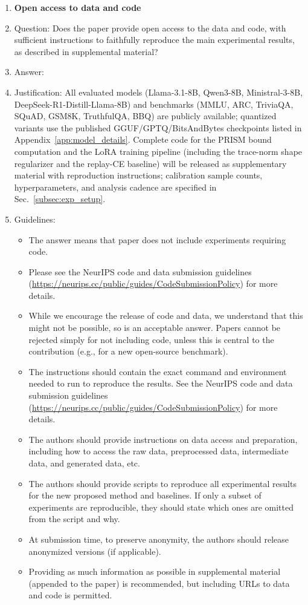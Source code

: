 \begin{enumerate}
\item {\bf Open access to data and code}
    \item[] Question: Does the paper provide open access to the data and code, with sufficient instructions to faithfully reproduce the main experimental results, as described in supplemental material?
    \item[] Answer: \answerYes{}
    \item[] Justification: All evaluated models (Llama-3.1-8B, Qwen3-8B, Ministral-3-8B, DeepSeek-R1-Distill-Llama-8B) and benchmarks (MMLU, ARC, TriviaQA, SQuAD, GSM8K, TruthfulQA, BBQ) are publicly available; quantized variants use the published GGUF/GPTQ/BitsAndBytes checkpoints listed in Appendix~\ref{app:model_details}. Complete code for the PRISM bound computation and the LoRA training pipeline (including the trace-norm shape regularizer and the replay-CE baseline) will be released as supplementary material with reproduction instructions; calibration sample counts, hyperparameters, and analysis cadence are specified in Sec.~\ref{subsec:exp_setup}.
    \item[] Guidelines:
    \begin{itemize}
        \item The answer \answerNA{} means that paper does not include experiments requiring code.
        \item Please see the NeurIPS code and data submission guidelines (\url{https://neurips.cc/public/guides/CodeSubmissionPolicy}) for more details.
        \item While we encourage the release of code and data, we understand that this might not be possible, so \answerNo{} is an acceptable answer. Papers cannot be rejected simply for not including code, unless this is central to the contribution (e.g., for a new open-source benchmark).
        \item The instructions should contain the exact command and environment needed to run to reproduce the results. See the NeurIPS code and data submission guidelines (\url{https://neurips.cc/public/guides/CodeSubmissionPolicy}) for more details.
        \item The authors should provide instructions on data access and preparation, including how to access the raw data, preprocessed data, intermediate data, and generated data, etc.
        \item The authors should provide scripts to reproduce all experimental results for the new proposed method and baselines. If only a subset of experiments are reproducible, they should state which ones are omitted from the script and why.
        \item At submission time, to preserve anonymity, the authors should release anonymized versions (if applicable).
        \item Providing as much information as possible in supplemental material (appended to the paper) is recommended, but including URLs to data and code is permitted.
    \end{itemize}



\end{enumerate}
